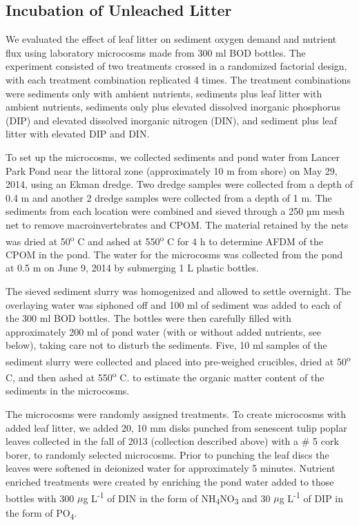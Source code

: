 \subsection{Incubation of Unleached Litter}
We evaluated the effect of leaf litter on sediment oxygen demand and nutrient flux using laboratory microcosms made from 300 ml BOD bottles. The experiment consisted of two treatments crossed in a randomized factorial design, with each treatment combination replicated 4 times. The treatment combinations were sediments only with ambient nutrients, sediments plus leaf litter with ambient nutrients, sediments only plus elevated dissolved inorganic phosphorus (DIP) and elevated dissolved inorganic nitrogen (DIN), and sediment plus leaf litter with elevated DIP and DIN. 

To set up the microcosms, we collected sediments and pond water from Lancer Park Pond near the littoral zone (approximately 10 m from shore) on May 29, 2014, using an Ekman dredge.  Two dredge samples were collected from a depth of 0.4 m and another 2 dredge samples were collected from a depth of 1 m. The sediments from each location were combined and sieved through a 250 µm mesh net to remove macroinvertebrates and CPOM. The material retained by the nets was dried at 50\textsuperscript{o} C and ashed at 550\textsuperscript{o} C for 4 h to determine AFDM of the CPOM in the pond. The water for the microcosms was  collected from the pond at 0.5 m on June 9, 2014 by submerging 1 L plastic bottles.

The sieved sediment slurry was homogenized and allowed to settle overnight. The overlaying water was siphoned off and 100 ml of sediment was added to each of the 300 ml BOD bottles. The bottles were then carefully filled with approximately 200 ml of pond water (with or without added nutrients, see below), taking care not to disturb the sediments. Five, 10 ml samples of the sediment slurry were collected and placed into pre-weighed crucibles, dried at 50\textsuperscript{o} C, and then ashed at 550\textsuperscript{o} C. to estimate the organic matter content of the sediments in the microcosms.

The microcosms were randomly assigned treatments. To create microcosms with added leaf litter, we added 20, 10 mm disks punched from senescent tulip poplar leaves collected in the fall of 2013 (collection described above) with a \# 5 cork borer, to randomly selected microcosms. Prior to punching the leaf discs the leaves were softened in deionized water for approximately 5 minutes. Nutrient enriched treatments were created by enriching the pond water added to those bottles with 300 $\mu$g L\textsuperscript{-1} of DIN in the form of NH\textsubscript{4}NO\textsubscript{3} and 30 $\mu$g L\textsuperscript{-1} of DIP in the form of PO\textsubscript{4}.

